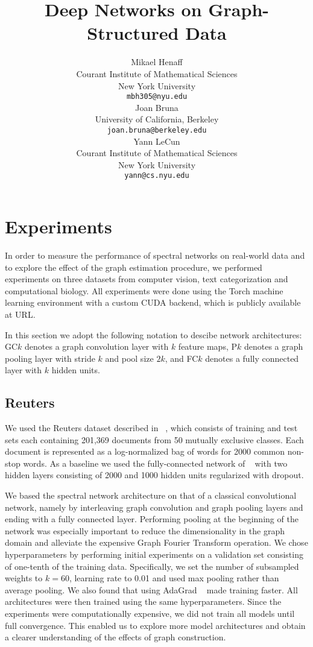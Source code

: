 \documentclass{article} %
\title{Deep Networks on Graph-Structured Data}
\author{
Mikael Henaff \\
Courant Institute of Mathematical Sciences\\
New York University\\
\texttt{mbh305@nyu.edu} \\
\And
Joan Bruna \\
University of California, Berkeley \\
\texttt{joan.bruna@berkeley.edu} \\
\AND
Yann LeCun \\
Courant Institute of Mathematical Sciences \\
New York University \\
\texttt{yann@cs.nyu.edu} \\
}
\begin{document}
\maketitle

\begin{abstract}

\end{abstract}

\section{Experiments}

In order to measure the performance of spectral networks on real-world data and to explore the effect of the graph estimation procedure, we performed experiments on three datasets from computer vision, text categorization and computational biology. All experiments were done using the Torch machine learning environment with a custom CUDA backend, which is publicly available at URL.

In this section we adopt the following notation to descibe network architectures: GC$k$ denotes a graph convolution layer with $k$ feature maps, P$k$ denotes a graph pooling layer with stride $k$ and pool size $2k$, and FC$k$ denotes a fully connected layer with $k$ hidden units.


\subsection{Reuters}

We used the Reuters dataset described in ~\cite{Hinton2012}, which consists of training and test sets each containing 201,369 documents from 50 mutually exclusive classes. Each document is represented as a log-normalized bag of words for 2000 common non-stop words. As a baseline we used the fully-connected network of ~\cite{Hinton2012} with two hidden layers consisting of 2000 and 1000 hidden units regularized with dropout.  

We based the spectral network architecture on that of a classical convolutional network, namely by interleaving graph convolution and graph pooling layers and ending with a fully connected layer. Performing pooling at the beginning of the network was especially important to reduce the dimensionality in the graph domain and alleviate the expensive Graph Fourier Transform operation.  We chose hyperparameters by performing initial experiments on a validation set consisting of one-tenth of the training data. Specifically, we set the number of subsampled weights to $k=60$, learning rate to 0.01 and used max pooling rather than average pooling. We also found that using AdaGrad ~\cite{adagrad} made training faster. All architectures were then trained using the same hyperparameters.
Since the experiments were computationally expensive, we did not train all models until full convergence. This enabled us to explore more model architectures and obtain a clearer understanding of the effects of graph construction.  
\end{document}
